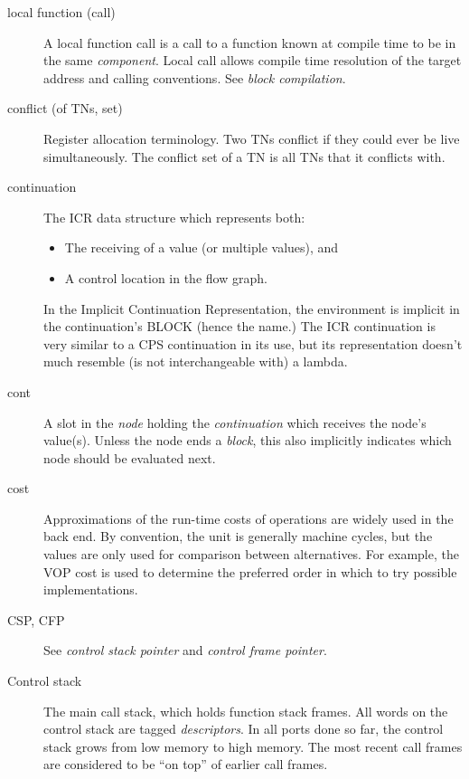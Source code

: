 \begin{description}
\item[local function (call)]
A local function call is a call to a function known at compile time to be
in the same {\it component}.  Local call allows compile time resolution of the
target address and calling conventions.  See {\it block compilation}.

\item[conflict (of TNs, set)]
Register allocation terminology.  Two TNs conflict if they could ever be
live simultaneously.  The conflict set of a TN is all TNs that it conflicts
with.

\item[continuation]
The ICR data structure which represents both:
\begin{itemize}
\item The receiving of a value (or multiple values), and

\item A control location in the flow graph.
\end{itemize}
In the Implicit Continuation Representation, the environment is implicit in the
continuation's BLOCK (hence the name.)  The ICR continuation is very similar to
a CPS continuation in its use, but its representation doesn't much resemble (is
not interchangeable with) a lambda.

\item[cont] A slot in the {\it node} holding the {\it continuation} which
receives the node's value(s).  Unless the node ends a {\it block}, this also
implicitly indicates which node should be evaluated next.

\item[cost] Approximations of the run-time costs of operations are widely used
in the back end.  By convention, the unit is generally machine cycles, but the
values are only used for comparison between alternatives.  For example, the
VOP cost is used to determine the preferred order in which to try possible
implementations.
    
\item[CSP, CFP] See {\it control stack pointer} and {\it control frame
pointer}.

\item[Control stack] The main call stack, which holds function stack frames.
All words on the control stack are tagged {\it descriptors}.  In all ports done
so far, the control stack grows from low memory to high memory.  The most
recent call frames are considered to be ``on top'' of earlier call frames.


\end{description}
